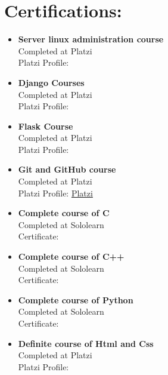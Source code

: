 \documentclass{article}
\begin{document}
\begin{minipage}[t]{8cm}
\vspace*{-2cm}
\section*{Certifications:}
\begin{itemize}
\item \textbf{Server linux administration course}\\
  Completed at Platzi\\
  Platzi Profile: \href{https://platzi.com/p/windowsky/}{\color{Blue}{Platzi}}
\item \textbf{Django Courses}\\
  Completed at Platzi\\
  Platzi Profile: \href{https://platzi.com/p/windowsky/}{\color{Blue}{Platzi}}
\item \textbf{Flask Course}\\
  Completed at Platzi\\
  Platzi Profile: \href{https://platzi.com/p/windowsky/}{\color{Blue}{Platzi}}
\item \textbf{Git and GitHub course}\\
  Completed at Platzi\\
  Platzi Profile: \href{https://platzi.com/p/windowsky/}{Platzi}
\item \textbf{Complete course of C}\\
  Completed at Sololearn\\
  Certificate: \href{https://www.sololearn.com/Certificate/1089-18624671/jpg/}{\color{Blue}{Sololearn}}
\item \textbf{Complete course of C++}\\
  Completed at Sololearn\\
  Certificate: \href{https://www.sololearn.com/certificates/course/en/18624671/1051/landscape/png}{\color{Blue}{Sololearn}}
\item \textbf{Complete course of Python}\\
  Completed at Sololearn\\
  Certificate: \href{https://www.sololearn.com/Certificate/1073-18624671/jpg/}{\color{Blue}{Sololearn}}
\item \textbf{Definite course of Html and Css}\\
  Completed at Platzi\\
  Platzi Profile: \href{https://platzi.com/p/windowsky/}{\color{Blue}{Platzi}}
            

\end{itemize}
\end{minipage}
\end{document}
